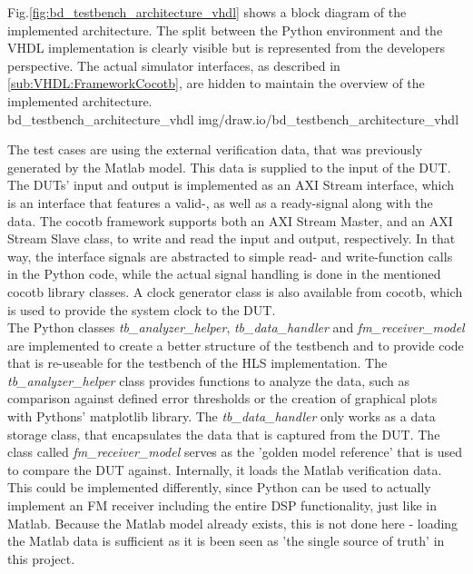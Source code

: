 Fig.\ref{fig:bd_testbench_architecture_vhdl} shows a block diagram of the implemented architecture.
The split between the Python environment and the VHDL implementation is clearly visible but is represented from the developers perspective.
The actual simulator interfaces, as described in \ref{sub:VHDL:FrameworkCocotb}, are hidden to maintain the overview of the implemented architecture.\\

 {bd_testbench_architecture_vhdl} {img/draw.io/bd_testbench_architecture_vhdl}

The test cases are using the external verification data, that was previously generated by the Matlab model.
This data is supplied to the input of the DUT.
The DUTs' input and output is implemented as an AXI Stream interface, which is an interface that features a valid-, as well as a ready-signal along with the data.
The cocotb framework supports both an AXI Stream Master, and an AXI Stream Slave class, to write and read the input and output, respectively.
In that way, the interface signals are abstracted to simple read- and write-function calls in the Python code, while the actual signal handling is done in the mentioned cocotb library classes.
A clock generator class is also available from cocotb, which is used to provide the system clock to the DUT.\\

The Python classes \textit{tb\_analyzer\_helper}, \textit{tb\_data\_handler} and \textit{fm\_receiver\_model} are implemented to create a better structure of the testbench and to provide code that is re-useable for the testbench of the HLS implementation.
The \textit{tb\_analyzer\_helper} class provides functions to analyze the data, such as comparison against defined error thresholds or the creation of graphical plots with Pythons' matplotlib library.
The \textit{tb\_data\_handler} only works as a data storage class, that encapsulates the data that is captured from the DUT.
The class called \textit{fm\_receiver\_model} serves as the 'golden model reference' that is used to compare the DUT against.
Internally, it loads the Matlab verification data.
This could be implemented differently, since Python can be used to actually implement an FM receiver including the entire DSP functionality, just like in Matlab.
Because the Matlab model already exists, this is not done here - loading the Matlab data is sufficient as it is been seen as 'the single source of truth' in this project.\\


